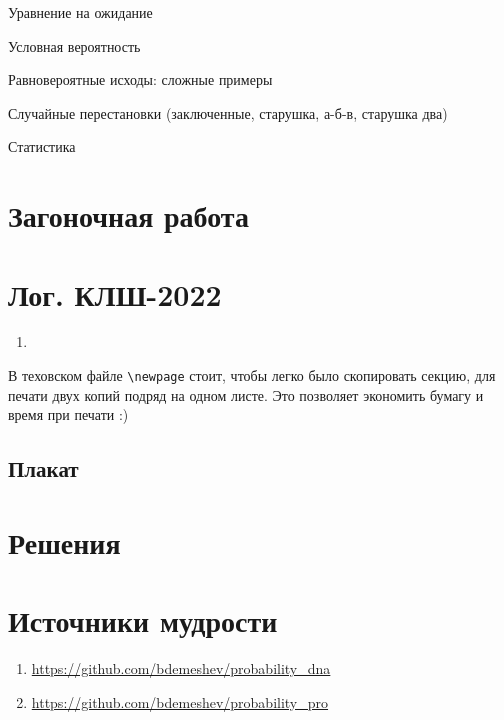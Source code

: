 \documentclass[12pt]{article}
\newcounter{problem}[section]
\theoremstyle{definition}
\begin{document}
Уравнение на ожидание

Условная вероятность

Равновероятные исходы: сложные примеры

Случайные перестановки (заключенные, старушка, а-б-в, старушка два)

Статистика




\section{Загоночная работа}





\newpage

\section{Лог. КЛШ-2022}

\begin{enumerate}
  \item 
\end{enumerate}

В теховском файле \verb|\newpage| стоит, чтобы легко было скопировать секцию, для печати двух копий подряд на одном листе.
Это позволяет экономить бумагу и время при печати :)

\subsection{Плакат}






\renewenvironment{solution}[1]{%
         \vskip .5cm plus 2cm minus 0.1cm%
         {\bfseries \hyperlink{problem:#1}{#1.}}%
}%
{%
}%



\section{Решения}



\section{Источники мудрости}


\begin{enumerate}
\item \url{https://github.com/bdemeshev/probability_dna}
\item \url{https://github.com/bdemeshev/probability_pro}
\end{enumerate}

\printbibliography[heading=none]
\end{document}
